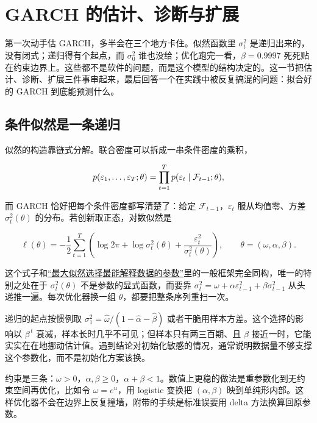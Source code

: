 \section{GARCH 的估计、诊断与扩展}
\label{sec:11-Mathematical-Statistics/10-GARCH-and-Volatility/03}

第一次动手估 GARCH，多半会在三个地方卡住。似然函数里 \(\sigma_t^2\) 是递归出来的，没有闭式；递归得有个起点，而 \(\sigma_0^2\) 谁也没给；优化跑完一看，\(\hat\beta=0.9997\) 死死贴在约束边界上。这些都不是软件的问题，而是这个模型的结构决定的。这一节把估计、诊断、扩展三件事串起来，最后回答一个在实践中被反复搞混的问题：拟合好的 GARCH 到底能预测什么。

\subsection{条件似然是一条递归}

似然的构造靠链式分解。联合密度可以拆成一串条件密度的乘积，

\[
p(\varepsilon_1,\dots,\varepsilon_T;\theta)=\prod_{t=1}^{T}p(\varepsilon_t\mid\mathcal F_{t-1};\theta),
\]

而 GARCH 恰好把每个条件密度都写清楚了：给定 \(\mathcal F_{t-1}\)，\(\varepsilon_t\) 服从均值零、方差 \(\sigma_t^2(\theta)\) 的分布。若创新取正态，对数似然是

\[
\ell(\theta)=-\frac12\sum_{t=1}^{T}\left(\log 2\pi+\log\sigma_t^2(\theta)+\frac{\varepsilon_t^2}{\sigma_t^2(\theta)}\right),
\qquad \theta=(\omega,\alpha,\beta).
\]

这个式子和\hyperref[sec:11-Mathematical-Statistics/02-Point-Estimation/03]{``最大似然选择最能解释数据的参数''}里的一般框架完全同构，唯一的特别之处在于 \(\sigma_t^2(\theta)\) 不是参数的显式函数，而要靠 \(\sigma_t^2=\omega+\alpha\varepsilon_{t-1}^2+\beta\sigma_{t-1}^2\) 从头递推一遍。每次优化器换一组 \(\theta\)，都要把整条序列重扫一次。

递归的起点按惯例取 \(\sigma_1^2=\hat\omega/(1-\hat\alpha-\hat\beta)\) 或者干脆用样本方差。这个选择的影响以 \(\beta^{\,t}\) 衰减，样本长时几乎不可见；但样本只有两三百期、且 \(\beta\) 接近一时，它能实实在在地挪动估计值。遇到结论对初始化敏感的情况，通常说明数据量不够支撑这个参数化，而不是初始化方案该换。

约束是三条：\(\omega>0\)，\(\alpha,\beta\ge0\)，\(\alpha+\beta<1\)。数值上更稳的做法是重参数化到无约束空间再优化，比如令 \(\omega=e^{u}\)，用 logistic 变换把 \((\alpha,\beta)\) 映到单纯形内部。这样优化器不会在边界上反复撞墙，附带的手续是标准误要用 delta 方法换算回原参数。

